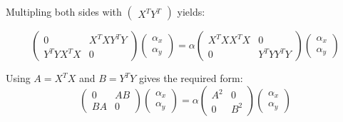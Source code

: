 Multipling both sides with $ \begin{pmatrix}
X^T Y^T \end{pmatrix} $ yields:

\begin{equation}
    \begin{pmatrix}
        0 & X^T X Y^T Y \\
        Y^T Y X^T X & 0
    \end{pmatrix}
    \begin{pmatrix}
        \alpha_x \\ \alpha_y
    \end{pmatrix}
    = \alpha \begin{pmatrix}
        X^T X X^T X & 0 \\
        0 & Y^T Y Y^T Y
    \end{pmatrix}
    \begin{pmatrix}
        \alpha_x \\ \alpha_y
    \end{pmatrix}
\end{equation}

Using $A = X^T X $ and $B = Y^T Y$ gives the required form:
\begin{equation}
    \begin{pmatrix}
        0 & A B \\
        B A & 0
    \end{pmatrix}
    \begin{pmatrix}
        \alpha_x \\ \alpha_y
    \end{pmatrix}
    = \alpha \begin{pmatrix}
        A^2 & 0 \\
        0 & B^2
    \end{pmatrix}
    \begin{pmatrix}
        \alpha_x \\ \alpha_y
    \end{pmatrix}
\end{equation}
